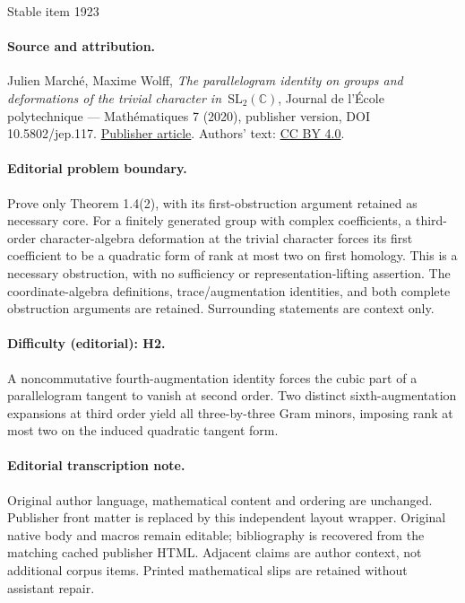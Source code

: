 \documentclass[11pt]{article}
\theoremstyle{definition}
\begin{document}
\begin{center}{\Large Stable item 1923}\end{center}
\paragraph{Source and attribution.}
Julien Marché, Maxime Wolff, \emph{The parallelogram identity on groups and deformations of the trivial character in $\mathrm{SL}_2(\mathbb{C})$}, Journal de l’École polytechnique — Mathématiques 7 (2020), publisher version, DOI 10.5802/jep.117. \href{https://jep.centre-mersenne.org/articles/10.5802/jep.117/}{Publisher article}. Authors' text: \href{https://creativecommons.org/licenses/by/4.0/}{CC BY 4.0}.
\paragraph{Editorial problem boundary.}
Prove only Theorem 1.4(2), with its first-obstruction argument retained as necessary core. For a finitely generated group with complex coefficients, a third-order character-algebra deformation at the trivial character forces its first coefficient to be a quadratic form of rank at most two on first homology. This is a necessary obstruction, with no sufficiency or representation-lifting assertion. The coordinate-algebra definitions, trace/augmentation identities, and both complete obstruction arguments are retained. Surrounding statements are context only.
\paragraph{Difficulty (editorial): H2.}
A noncommutative fourth-augmentation identity forces the cubic part of a parallelogram tangent to vanish at second order. Two distinct sixth-augmentation expansions at third order yield all three-by-three Gram minors, imposing rank at most two on the induced quadratic tangent form.
\paragraph{Editorial transcription note.}
Original author language, mathematical content and ordering are unchanged. Publisher front matter is replaced by this independent layout wrapper. Original native body and macros remain editable; bibliography is recovered from the matching cached publisher HTML. Adjacent claims are author context, not additional corpus items. Printed mathematical slips are retained without assistant repair.
\clearpage
\end{document}
